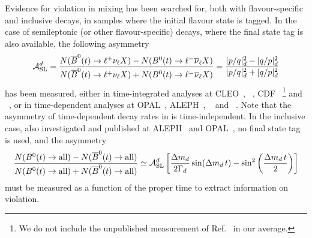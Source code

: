 
Evidence for \CP violation in \Bd mixing
has been searched for,
both with flavour-specific and inclusive \Bd decays, 
in samples where the initial 
flavour state is tagged. In the case of semileptonic 
(or other flavour-specific) decays, 
where the final state tag is 
also available, the following asymmetry
\begin{equation} 
\ASLd = \frac{
N(\hbox{\Bdbar}(t) \to \ell^+      \nu_{\ell} X) -
N(\hbox{\Bd}(t)    \to \ell^- \bar{\nu}_{\ell} X) }{
N(\hbox{\Bdbar}(t) \to \ell^+      \nu_{\ell} X) +
N(\hbox{\Bd}(t)    \to \ell^- \bar{\nu}_{\ell} X) } 
= \frac{|p/q|_{\particle{d}}^2 - |q/p|_{\particle{d}}^2}%
{|p/q|_{\particle{d}}^2 + |q/p|_{\particle{d}}^2}
\labe{ASL}
\end{equation} 
has been measured, either in time-integrated analyses at 
CLEO~\cite{Behrens:2000qu,Jaffe:2001hz,*Jaffe:2001hz_cont},
\babar~\cite{Lees:2014qma,*Lees:2014qma_cont},
CDF~\cite{Abe:1996zt}%
\footnote{
  \label{foot:life_mix:CDFnote9015:2007}
  We do not include the unpublished measurement of Ref.~\cite{CDFnote9015:2007} in our average.}
and \dzero~\cite{Abazov:2013uma,*Abazov:2011yk_mod,*Abazov:2010hv_mod_cont,*Abazov:2010hj_mod_cont,*Abazov:2011yk_cont,Abazov:2012uia},
or in time-dependent analyses at 
OPAL~\cite{Ackerstaff:1997vd}, ALEPH~\cite{Barate:2000uk}, 
\babar~\cite{Aubert:2003hd,*Aubert:2004xga_mod_cont,Lees:2013sua,*Margoni:2013qx,*Aubert:2006sa_mod,Aubert:2006nf,*Aubert:2002mn_mod_cont}
and \belle~\cite{Nakano:2005jb}.
Note that the asymmetry of time-dependent decay rates in  is time-independent.
In the inclusive case, also investigated and published
at ALEPH~\cite{Barate:2000uk} and OPAL~\cite{Abbiendi:1998av},
no final state tag is used, and the asymmetry~\cite{Beneke:1996hv,*Dunietz:1998av}
\begin{equation} 
\frac{
N(\hbox{\Bd}(t) \to {\rm all}) -
N(\hbox{\Bdbar}(t) \to {\rm all}) }{
N(\hbox{\Bd}(t) \to {\rm all}) +
N(\hbox{\Bdbar}(t) \to {\rm all}) } 
\simeq
\ASLd \left[ \frac{\dmd}{2\Gd} \sin(\dmd \,t) - 
\sin^2\left(\frac{\dmd \,t}{2}\right)\right] 
\labe{ASLincl}
\end{equation} 
must be measured as a function of the proper time to extract information 
on \CP violation.

